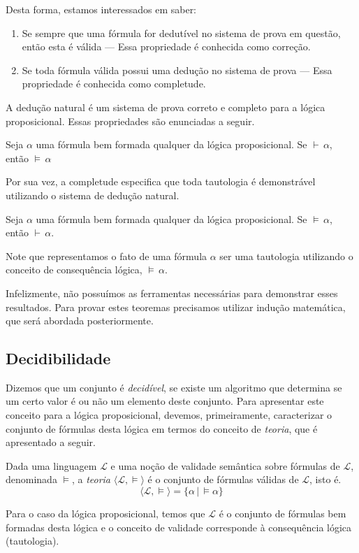 Desta forma, estamos interessados em saber:
\begin{enumerate}
    \item Se sempre que uma fórmula for dedutível no sistema de prova
      em questão, então esta é válida ---  Essa propriedade é
      conhecida como correção.
    \item Se toda fórmula válida possui uma dedução no sistema de
      prova --- Essa propriedade é conhecida como completude.
\end{enumerate}
A dedução natural é um sistema de
prova correto e completo para a lógica proposicional. Essas
propriedades são enunciadas a seguir.
\begin{Theorem}
Seja $\alpha$ uma fórmula bem formada qualquer da lógica
proposicional. Se $\vdash\,\alpha$, então $\models\,\alpha$
\end{Theorem}
Por sua vez, a completude
especifica que toda tautologia é demonstrável utilizando o sistema de
dedução natural.
\begin{Theorem}
Seja $\alpha$ uma fórmula bem formada qualquer da lógica
proposicional. Se $\models\,\alpha$, então $\vdash\,\alpha$.
\end{Theorem}
Note que representamos o fato de uma fórmula $\alpha$ ser uma
tautologia utilizando o conceito de consequência lógica,
$\models\,\alpha$.

Infelizmente, não possuímos as ferramentas necessárias para demonstrar
esses resultados. Para provar estes teoremas precisamos utilizar
indução matemática, que será abordada posteriormente.

\subsection{Decidibilidade}

Dizemos que um conjunto é \emph{decidível}, se existe um algoritmo que
determina se um certo valor é ou não um elemento deste conjunto. Para
apresentar este conceito para a lógica proposicional, devemos,
primeiramente, caracterizar o conjunto de fórmulas desta lógica em
termos do conceito de \emph{teoria}, que é apresentado a seguir.

\begin{Definition}[Teoria]
Dada uma linguagem $\mathcal{L}$ e uma noção de validade semântica
sobre fórmulas de $\mathcal{L}$, denominada $\models$, a \emph{teoria}
$\langle \mathcal{L}, \models\rangle$ é o conjunto de fórmulas válidas
de $\mathcal{L}$, isto é.
\[
\langle\mathcal{L},\models\rangle = \{\alpha\,|\,\models\alpha\}
\]
\end{Definition}
Para o caso da lógica proposicional, temos que $\mathcal{L}$ é o
conjunto de fórmulas bem formadas desta lógica e o conceito de
validade corresponde à consequência lógica (tautologia).

